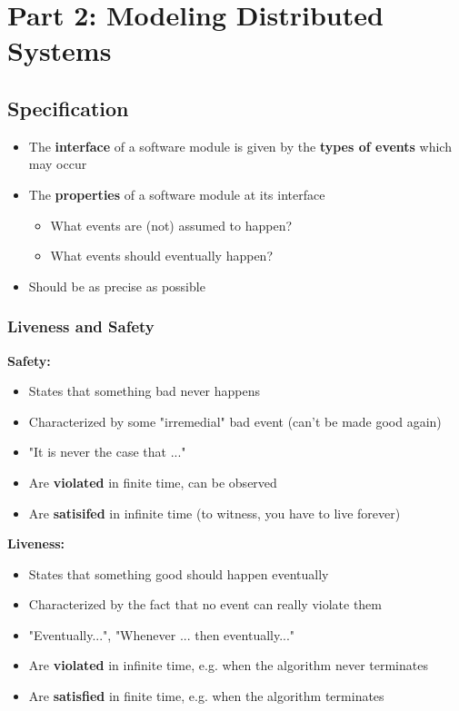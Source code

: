 \documentclass{scrartcl}
\begin{document}
\section{Part 2: Modeling Distributed Systems}
\subsection{Specification}
\begin{itemize}
    \item
        The \textbf{interface} of a software module is given by the \textbf{types of events} which may occur 
    \item
        The \textbf{properties} of a software module at its interface
        \begin{itemize}
            \item
                What events are (not) assumed to happen?
            \item
                What events should eventually happen?
        \end{itemize}
    \item
        Should be as precise as possible
\end{itemize}
\subsubsection{Liveness and Safety}
\textbf{Safety:}
\begin{itemize}
    \item
        States that something bad never happens    
    \item
        Characterized by some "irremedial" bad event (can't be made good again)
    \item
        "It is never the case that ..."
    \item
        Are \textbf{violated} in finite time, can be observed
    \item
        Are \textbf{satisifed} in infinite time (to witness, you have to live forever) 
\end{itemize}

\textbf{Liveness:}
\begin{itemize}
    \item
        States that something good should happen eventually
    \item
        Characterized by the fact that no event can really violate them
    \item
        "Eventually...", "Whenever ... then eventually..."
    \item
        Are \textbf{violated} in infinite time, e.g. when the algorithm never terminates
    \item
        Are \textbf{satisfied} in finite time, e.g. when the algorithm terminates
\end{itemize}
\end{document}
